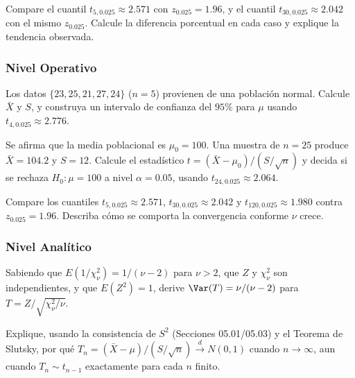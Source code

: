 \begin{problema}
	\label{prob:5.4.3}
	Compare el cuantil $t_{5,0.025}\approx 2.571$ con $z_{0.025}=1.96$, y el cuantil $t_{30,0.025}\approx 2.042$ con el mismo $z_{0.025}$. Calcule la diferencia porcentual en cada caso y explique la tendencia observada.
\end{problema}

\subsubsection*{Nivel Operativo}

\begin{problema}
	\label{prob:5.4.4}
	Los datos $\{23, 25, 21, 27, 24\}$ ($n=5$) provienen de una población normal. Calcule $\bar X$ y $S$, y construya un intervalo de confianza del $95\%$ para $\mu$ usando $t_{4,0.025}\approx 2.776$.
\end{problema}

\begin{problema}
	\label{prob:5.4.5}
	Se afirma que la media poblacional es $\mu_0=100$. Una muestra de $n=25$ produce $\bar X=104.2$ y $S=12$. Calcule el estadístico $t=(\bar X-\mu_0)/(S/\sqrt n)$ y decida si se rechaza $H_0:\mu=100$ a nivel $\alpha=0.05$, usando $t_{24,0.025}\approx 2.064$.
\end{problema}

\begin{problema}
	\label{prob:5.4.6}
	Compare los cuantiles $t_{5,0.025}\approx 2.571$, $t_{30,0.025}\approx 2.042$ y $t_{120,0.025}\approx 1.980$ contra $z_{0.025}=1.96$. Describa cómo se comporta la convergencia conforme $\nu$ crece.
\end{problema}

\subsubsection*{Nivel Analítico}

\begin{problema}
	\label{prob:5.4.7}
	Sabiendo que $E(1/\chi^2_\nu) = 1/(\nu-2)$ para $\nu>2$, que $Z$ y $\chi^2_\nu$ son independientes, y que $E(Z^2)=1$, derive $\Var(T)=\nu/(\nu-2)$ para $T=Z/\sqrt{\chi^2_\nu/\nu}$.
\end{problema}

\begin{problema}
	\label{prob:5.4.8}
	Explique, usando la consistencia de $S^2$ (Secciones 05.01/05.03) y el Teorema de Slutsky, por qué $T_n=(\bar X-\mu)/(S/\sqrt n) \xrightarrow{d} N(0,1)$ cuando $n\to\infty$, aun cuando $T_n \sim t_{n-1}$ exactamente para cada $n$ finito.
\end{problema}

